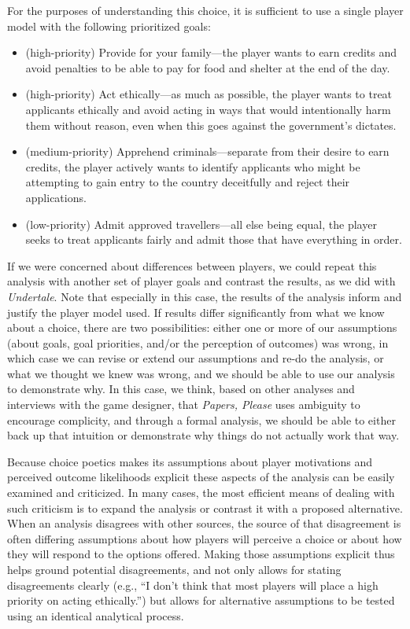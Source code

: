 \documentclass[arts,article,submit,moreauthors,pdftex,10pt,a4paper]{Definitions/mdpi}
\begin{document}
For the purposes of understanding this choice, it is sufficient to use a single player model with the following prioritized goals:
\begin{itemize}
  \item (high-priority) Provide for your family---the player wants to earn credits and avoid penalties to be able to pay for food and shelter at the end of the day.
  \item (high-priority) Act ethically---as much as possible, the player wants to treat applicants ethically and avoid acting in ways that would intentionally harm them without reason, even when this goes against the government's dictates.
  \item (medium-priority) Apprehend criminals---separate from their desire to earn credits, the player actively wants to identify applicants who might be attempting to gain entry to the country deceitfully and reject their applications.
  \item (low-priority) Admit approved travellers---all else being equal, the player seeks to treat applicants fairly and admit those that have everything in order.
\end{itemize}
If we were concerned about differences between players, we could repeat this analysis with another set of player goals and contrast the results, as we did with \emph{Undertale}.
%
Note that especially in this case, the results of the analysis inform and justify the player model used.
%
If results differ significantly from what we know about a choice, there are two possibilities: either one or more of our assumptions (about goals, goal priorities, and/or the perception of outcomes) was wrong, in which case we can revise or extend our assumptions and re-do the analysis, or what we thought we knew was wrong, and we should be able to use our analysis to demonstrate why.
%
In this case, we think, based on other analyses and interviews with the game designer, that \emph{Papers, Please} uses ambiguity to encourage complicity, and through a formal analysis, we should be able to either back up that intuition or demonstrate why things do not actually work that way.


Because choice poetics makes its assumptions about player motivations and perceived outcome likelihoods explicit these aspects of the analysis can be easily examined and criticized.
%
In many cases, the most efficient means of dealing with such criticism is to expand the analysis or contrast it with a proposed alternative.
%
When an analysis disagrees with other sources, the source of that disagreement is often differing assumptions about how players will perceive a choice or about how they will respond to the options offered.
%
Making those assumptions explicit thus helps ground potential disagreements, and not only allows for stating disagreements clearly (e.g., ``I don't think that most players will place a high priority on acting ethically.'') but allows for alternative assumptions to be tested using an identical analytical process.
\end{document}
